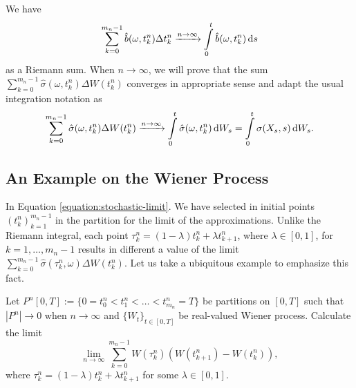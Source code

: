 We have
$$\sum\limits_{k=0}^{m_n-1}  \hat{b}(\omega, t_k^n)\Delta t^n_{k}\xrightarrow{n\to\infty} \int\limits_0^t \hat{b}(\omega, t_k^n)\,\mathrm{d} s$$
as a Riemann sum. When $n\to\infty$, we will prove that the sum $\sum\limits_{k=0}^{m_n-1} \hat{\sigma}(\omega, t_k^n)\Delta W(t^n_{k})$ converges in appropriate sense and adapt the usual integration notation as
\begin{equation}
  \sum\limits_{k=0}^{m_n-1} \hat{\sigma}(\omega, t_k^n)\Delta W(t^n_{k}) \xrightarrow{n\to\infty} \int\limits_0^t \hat{\sigma}(\omega, t_k^n)\,\mathrm{d} W_s = \int\limits_0^t \sigma(X_s,s)\,\mathrm{d} W_s.
\end{equation}

\subsection{An Example on the Wiener Process}

In Equation \ref{equation:stochastic-limit}. We have selected in initial points $(t_k^n)_{k=1}^{m_n-1}$ in the partition for the limit of the approximations. Unlike the Riemann integral, each point $\tau_k^n = (1-\lambda) t_k^n + \lambda t_{k+1}^n$, where $\lambda\in[0,1]$, for $k=1,\ldots, m_n-1$ results in different a value of the limit $\sum\limits_{k=0}^{m_n-1} \hat{\sigma}(\tau_k^n, \omega)\Delta W(t^n_{k})$. Let us take a ubiquitous example to emphasize this fact.



\begin{example}
  \label{example:wdw}
  Let $P^n[0,T]:=\{0=t^n_0<t^n_1<\ldots<t^n_{m_n}=T\}$ be partitions on $[0,T]$ such that $|P^n|\to0$ when $n\to\infty$ and $\{W_t\}_{t\in[0,T]}$ be real-valued Wiener process. Calculate the limit
  \begin{equation}
    \lim\limits_{n\to\infty}\sum\limits_{k=0}^{m_n-1} W(\tau_k^n)(W(t^n_{k+1})-W(t^n_{k})),
  \end{equation}
  where
  $\tau_k^n = (1-\lambda) t_k^n + \lambda t_{k+1}^n$ for some $\lambda\in[0,1]$.
\end{example}


